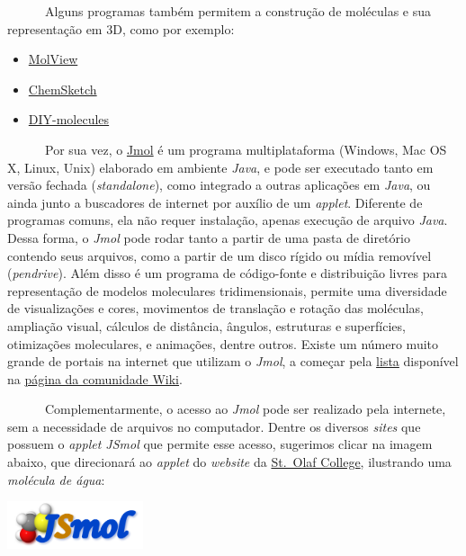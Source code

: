 \documentclass[
  letterpaper,
  DIV=11,
  numbers=noendperiod]{scrreprt}
\providecommand{\tightlist}{%
  \setlength{\itemsep}{0pt}\setlength{\parskip}{0pt}}\usepackage{longtable,booktabs,array}
\begin{document}
~~~~~~Alguns programas também permitem a construção de moléculas e sua
representação em 3D, como por exemplo:

\begin{itemize}
\tightlist
\item
  \href{https://molview.org/}{MolView}
\item
  \href{https://www.acdlabs.com/resources/free-chemistry-software-apps/chemsketch-freeware/}{ChemSketch}
\item
  \href{https://biomodel.uah.es/en/DIY/JSME/draw.en.htm}{DIY-molecules}
\end{itemize}

~~~~~~Por sua vez, o \href{http://jmol.sourceforge.net/}{Jmol} é um
programa multiplataforma (Windows, Mac OS X, Linux, Unix) elaborado em
ambiente \emph{Java}, e pode ser executado tanto em versão fechada
(\emph{standalone}), como integrado a outras aplicações em \emph{Java},
ou ainda junto a buscadores de internet por auxílio de um \emph{applet}.
Diferente de programas comuns, ela não requer instalação, apenas
execução de arquivo \emph{Java}. Dessa forma, o \emph{Jmol} pode rodar
tanto a partir de uma pasta de diretório contendo seus arquivos, como a
partir de um disco rígido ou mídia removível (\emph{pendrive}). Além
disso é um programa de código-fonte e distribuição livres para
representação de modelos moleculares tridimensionais, permite uma
diversidade de visualizações e cores, movimentos de translação e rotação
das moléculas, ampliação visual, cálculos de distância, ângulos,
estruturas e superfícies, otimizações moleculares, e animações, dentre
outros. Existe um número muito grande de portais na internet que
utilizam o \emph{Jmol}, a começar pela
\href{http://wiki.jmol.org/index.php/Websites_Using_Jmol:_A-L}{lista}
disponível na \href{http://wiki.jmol.org/index.php/Main_Page}{página da
comunidade Wiki}.

~~~~~~Complementarmente, o acesso ao \emph{Jmol} pode ser realizado pela
internete, sem a necessidade de arquivos no computador. Dentre os
diversos \emph{sites} que possuem o \emph{applet JSmol} que permite esse
acesso, sugerimos clicar na imagem abaixo, que direcionará ao
\emph{applet} do \emph{website} da
\href{https://chemapps.stolaf.edu/jmol/jmol.php?}{St.~Olaf College},
ilustrando uma \emph{molécula de água}:

\href{https://chemapps.stolaf.edu/jmol/jmol.php?model=water}{\includegraphics[width=0.3\textwidth,height=\textheight]{jsmol.png}}
\end{document}

